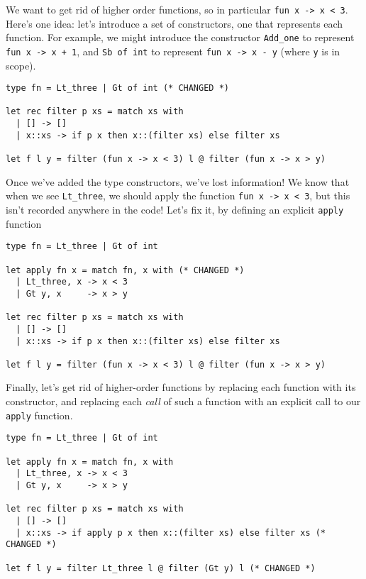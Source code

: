 We want to get rid of higher order functions, so in particular \texttt{fun x -> x < 3}. Here's one idea: let's introduce a set of constructors, one that represents each function. For example, we might introduce the constructor \texttt{Add\_one} to represent \texttt{fun x -> x + 1}, and \texttt{Sb of int} to represent \texttt{fun x -> x - y} (where \texttt{y} is in scope).

\begin{code}
\label{code:defun-1}
\begin{verbatim}
type fn = Lt_three | Gt of int (* CHANGED *)

let rec filter p xs = match xs with
  | [] -> []
  | x::xs -> if p x then x::(filter xs) else filter xs

let f l y = filter (fun x -> x < 3) l @ filter (fun x -> x > y)
\end{verbatim}
\end{code}

Once we've added the type constructors, we've lost information! We know that when we see \texttt{Lt\_three}, we should apply the function \texttt{fun x -> x < 3}, but this isn't recorded anywhere in the code! Let's fix it, by defining an explicit \texttt{apply} function

\begin{code}
\label{code:defun-2}
\begin{verbatim}
type fn = Lt_three | Gt of int 

let apply fn x = match fn, x with (* CHANGED *)
  | Lt_three, x -> x < 3
  | Gt y, x     -> x > y
  
let rec filter p xs = match xs with 
  | [] -> []
  | x::xs -> if p x then x::(filter xs) else filter xs

let f l y = filter (fun x -> x < 3) l @ filter (fun x -> x > y)
\end{verbatim}
\end{code}

Finally, let's get rid of higher-order functions by replacing each function with its constructor, and replacing each \emph{call} of such a function with an explicit call to our \texttt{apply} function. 

\begin{code}
\label{code:defun-3}
\begin{verbatim}
type fn = Lt_three | Gt of int 

let apply fn x = match fn, x with
  | Lt_three, x -> x < 3
  | Gt y, x     -> x > y
  
let rec filter p xs = match xs with
  | [] -> []
  | x::xs -> if apply p x then x::(filter xs) else filter xs (* CHANGED *)

let f l y = filter Lt_three l @ filter (Gt y) l (* CHANGED *)
\end{verbatim}
\end{code}


